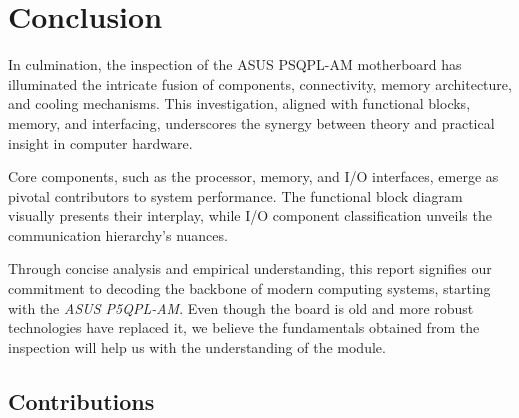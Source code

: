 \chapter{Conclusion}\label{ch:Conclusion}

In culmination, the inspection of the ASUS PSQPL-AM motherboard has illuminated the intricate fusion of components, connectivity, memory architecture, and cooling mechanisms. This investigation, aligned with functional blocks, memory, and interfacing, underscores the synergy between theory and practical insight in computer hardware.

Core components, such as the processor, memory, and I/O interfaces, emerge as pivotal contributors to system performance. The functional block diagram visually presents their interplay, while I/O component classification unveils the communication hierarchy's nuances.


Through concise analysis and empirical understanding, this report signifies our commitment to decoding the backbone of modern computing systems, starting with the \emph{ASUS P5QPL-AM}. Even though the board is old and more robust technologies have replaced it, we believe the fundamentals obtained from the inspection will help us with the understanding of the module.



\section{Contributions}

